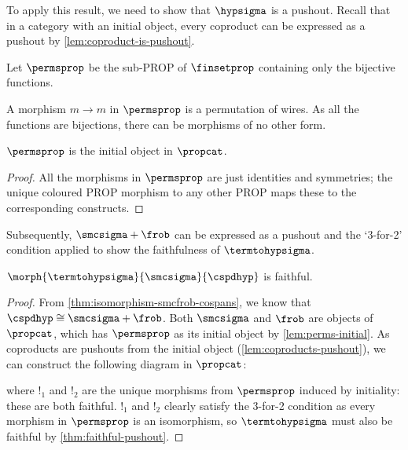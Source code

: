 To apply this result, we need to show that \(\hypsigma\) is a pushout.
Recall that in a category with an initial object, every coproduct can be
expressed as a pushout by \cref{lem:coproduct-is-pushout}.

\begin{definition}
    Let \(\permsprop\) be the sub-PROP of \(\finsetprop\)
    containing only the bijective functions.
\end{definition}

A morphism \(m \to m\) in \(\permsprop\) is a
permutation of wires.
As all the functions are bijections, there can be morphisms of no other form.

\begin{lemma}\label{lem:perms-initial}
    \(\permsprop\) is the initial object in \(\propcat\).
\end{lemma}
\begin{proof}
    All the morphisms in \(\permsprop\) are just
    identities and symmetries; the unique coloured PROP morphism to any other
    PROP maps these to the corresponding constructs.
\end{proof}

Subsequently, \(\smcsigma + \frob\) can be expressed as a pushout and the
`3-for-2' condition applied to show the faithfulness of \(\termtohypsigma\).

\begin{proposition}
    \(\morph{\termtohypsigma}{\smcsigma}{\cspdhyp}\) is faithful.
\end{proposition}
\begin{proof}
    From \cref{thm:isomorphism-smcfrob-cospans}, we know that
    \(\cspdhyp \cong \smcsigma + \frob\).
    Both \(\smcsigma\) and \(\frob\) are objects of \(\propcat\), which has
    \(\permsprop\) as its initial object by \cref{lem:perms-initial}.
    As coproducts are pushouts from the initial object
    (\cref{lem:coproducts-pushout}), we can construct the following diagram in
    \(\propcat\):
    \begin{center}
        
    \end{center}
    where \(!_1\) and \(!_2\) are the unique morphisms from
    \(\permsprop\) induced by initiality: these are both faithful.
    \(!_1\) and \(!_2\) clearly satisfy the 3-for-2 condition as every morphism
    in \(\permsprop\) is an isomorphism, so \(\termtohypsigma\) must also
    be faithful by \cref{thm:faithful-pushout}.
\end{proof}


